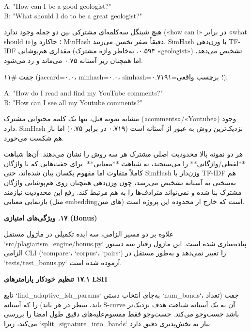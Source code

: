 \documentclass[11pt]{article}
\begin{document}
{\mycode
\begin{flushleft}
A: "How can I be a good geologist?" \\
B: "What should I do to be a great geologist?"
\end{flushleft}}

\noindent ‏هیچ شینگل سه‌کلمه‌ای مشترکی بین دو جمله وجود ندارد («how can i» در برابر «what should i»)؛ جاکارد و MinHash دقیقاً صفر تخمین می‌زنند. SimHash با وزن‌دهی TF-IDF مقداری هم‌پوشانی (۰.۵۹۴، به‌خاطر واژه مشترک «geologist») تشخیص می‌دهد، اما همچنان زیر آستانه ۰.۷۵ می‌ماند و رد می‌شود.\par

\noindent ‏جفت \#۱۱ (jaccard=۰.۰، minhash=۰.۰، simhash=۰.۷۱۹؛ برچسب واقعی=۱):\par

{\mycode
\begin{flushleft}
A: "How do I read and find my YouTube comments?" \\
B: "How can I see all my Youtube comments?"
\end{flushleft}}

\noindent ‏مشابه نمونه قبل، تنها یک کلمه محتوایی مشترک («comments»/«Youtube») وجود دارد. SimHash نزدیک‌ترین روش به عبور از آستانه است (۰.۷۱۹ در برابر ۰.۷۵) اما باز هم شکست می‌خورد.\par

\noindent ‏هر دو نمونه بالا محدودیت اصلی مشترک هر سه روش را نشان می‌دهند: آن‌ها شباهت **لفظی/واژگانی** را می‌سنجند، نه شباهت **معنایی**. برای جفت‌هایی که با واژگان کاملاً متفاوت اما مفهوم یکسان بیان شده‌اند، حتی SimHash وزن‌دار با TF-IDF هم به‌سختی به آستانه تشخیص می‌رسد، چون وزن‌دهی همچنان روی هم‌پوشانی واژگان مشترک بنا شده و نمی‌تواند مترادف‌ها را به هم مرتبط کند. رفع این محدودیت نیازمند بازنمایی معنایی (مثل embeddingهای متن) است که خارج از محدوده این پروژه است.\par

\medskip\noindent\hrulefill\medskip

\medskip
{\large\bfseries ‏۱۷. ویژگی‌های امتیازی (Bonus)}\medskip


\noindent ‏علاوه بر دو مسیر الزامی، سه ایده تکمیلی در ماژول مستقل `src/plagiarism\_engine/bonus.py` پیاده‌سازی شده است. این ماژول رفتار سه دستور الزامی CLI (`compare`، `corpus`، `pairs`) را تغییر نمی‌دهد و به‌طور مستقل در `tests/test\_bonus.py` آزموده شده است.\par

\smallskip
{\bfseries ‏۱۷.۱ تنظیم خودکار پارامترهای LSH}\smallskip


\noindent ‏تابع `find\_adaptive\_lsh\_params` به‌جای انتخاب دستی `num\_bands`، جفت (تعداد باند، سطر در هر باند) را که آستانه S-curve آن به یک آستانه شباهت هدف نزدیک‌تر باشد جست‌وجو می‌کند. جست‌وجو فقط مقسوم‌علیه‌های دقیق طول امضا را بررسی می‌کند، زیرا `split\_signature\_into\_bands` نیاز به بخش‌پذیری دقیق دارد.\par
\end{document}
